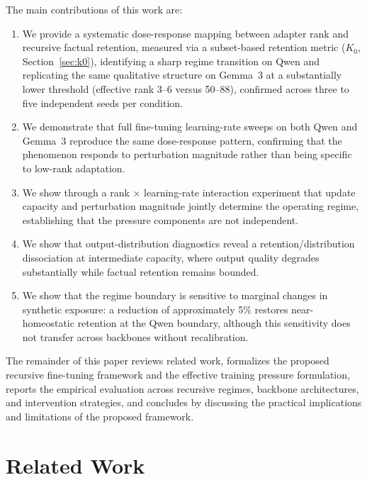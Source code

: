 \documentclass[a4paper,fleqn]{cas-dc}
\begin{document}
The main contributions of this work are:
\begin{enumerate}
    \item We provide a systematic dose-response mapping between adapter rank and
    recursive factual retention, measured via a subset-based retention metric
    ($K_0$, Section~\ref{sec:k0}), identifying a sharp regime transition on Qwen
    and replicating the same qualitative structure on Gemma~3 at a
    substantially lower threshold (effective rank 3--6 versus 50--88),
    confirmed across three to five independent seeds per condition.
    \item We demonstrate that full fine-tuning learning-rate sweeps on both
    Qwen and Gemma~3 reproduce the same dose-response pattern, confirming that
    the phenomenon responds to perturbation magnitude rather than being
    specific to low-rank adaptation.
    \item We show through a rank $\times$ learning-rate interaction experiment
    that update capacity and perturbation magnitude jointly determine the
    operating regime, establishing that the pressure components are not
    independent.
    \item We show that output-distribution diagnostics reveal a
    retention/distribution dissociation at intermediate capacity, where output
    quality degrades substantially while factual retention remains bounded.
    \item We show that the regime boundary is sensitive to marginal changes
    in synthetic exposure: a reduction of approximately 5\% restores
    near-homeostatic retention at the Qwen boundary, although this sensitivity
    does not transfer across backbones without recalibration.
\end{enumerate}

The remainder of this paper reviews related work, formalizes the proposed
recursive fine-tuning framework and the effective training pressure formulation,
reports the empirical evaluation across recursive regimes, backbone
architectures, and intervention strategies, and concludes by discussing the
practical implications and limitations of the proposed framework.

\section{Related Work}\label{sec:related}
\end{document}
